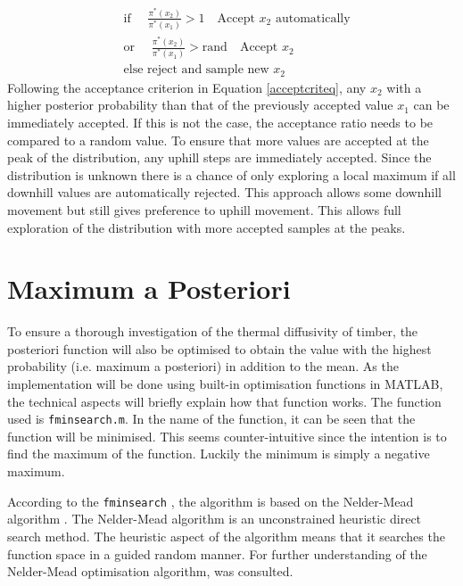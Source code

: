 		\begin{equation} \label{acceptcriteq}
		\begin{aligned}
		&\text{if  }\quad \frac{\pi^*  (x_2)}{\pi^* (x_1)} > 1 \quad \text{Accept } x_2 \text{ automatically}\\
		&\text{or  }\quad \frac{\pi^* (x_2)}{\pi^* (x_1)} > \text{rand}  \quad \text{Accept } x_2\\
		&\text{else reject and sample new } x_2
		\end{aligned}
		\end{equation}
Following the acceptance criterion in Equation \ref{acceptcriteq}, any $x_2$ with a higher posterior probability than that of the previously accepted value $x_1$ can be immediately accepted.
If this is not the case, the acceptance ratio needs to be compared to a random value.
To ensure that more values are accepted at the peak of the distribution, any uphill steps are immediately accepted.
Since the distribution is unknown there is a chance of only exploring a local maximum if all downhill values are automatically rejected.
This approach allows some downhill movement but still gives preference to uphill movement.
This allows full exploration of the distribution with more accepted samples at the peaks.

\section{Maximum a Posteriori} \label{neldersec}
To ensure a thorough investigation of the thermal diffusivity of timber, the posteriori function will also be optimised to obtain the value with the highest probability (i.e. maximum a posteriori) in addition to the mean.
As the implementation will be done using built-in optimisation functions in MATLAB, the technical aspects will briefly explain how that function works.
The function used is \texttt{fminsearch.m}.
In the name of the function, it can be seen that the function will be minimised.
This seems counter-intuitive since the intention is to find the maximum of the function. 
Luckily the minimum is simply a negative maximum. 

According to the \texttt{fminsearch} \citet{Matlab}, the algorithm is based on the Nelder-Mead algorithm \citep{Lagarias:1998}.
The Nelder-Mead algorithm is an unconstrained heuristic direct search method.
The heuristic aspect of the algorithm means that it searches the function space in a guided random manner.
For further understanding of the Nelder-Mead optimisation algorithm, \citet{sachin:2016} was consulted.

